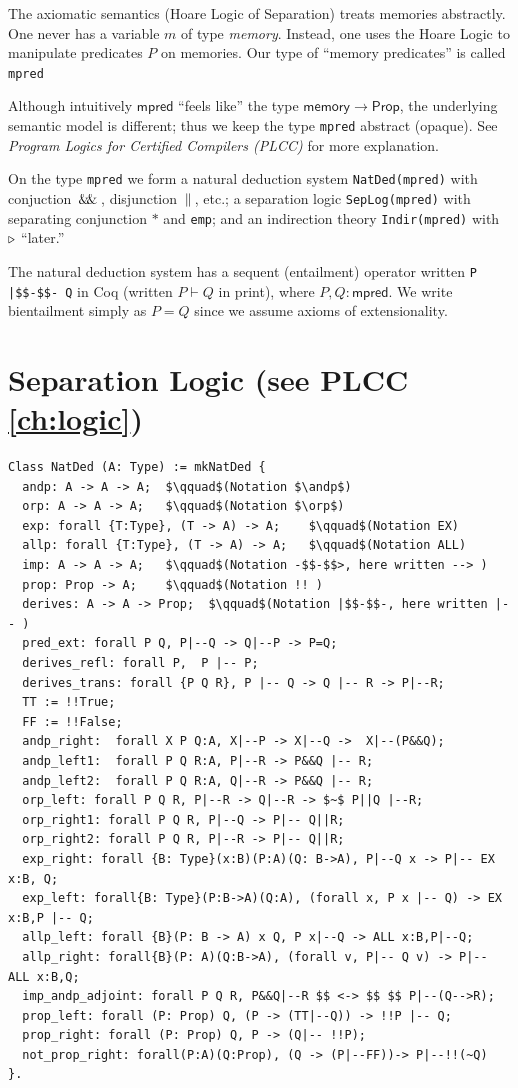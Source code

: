 \documentclass[12pt,fleqn,openany,oneside,showtrims]{memoir}
\newcommand{\ychapter}[2]{\chapter[#1]{#1 \hfill \normalsize #2}}
\begin{document}
The axiomatic semantics (Hoare Logic of Separation) treats
memories abstractly.  One never has a variable $m$ of type
\emph{memory}.  Instead, one uses the Hoare Logic to manipulate
predicates $P$ on memories.  
Our type of ``memory predicates'' is called \lstinline{mpred}

Although intuitively $\mathsf{mpred}$
``feels like'' the type $\mathsf{memory}\rightarrow\mathsf{Prop}$,
the underlying semantic model is different;
thus we keep the type \lstinline{mpred} abstract (opaque).
See \emph{Program Logics for Certified Compilers (PLCC)} 
for more explanation.

On the type \lstinline{mpred}
we form a natural deduction  system 
\lstinline{NatDed(mpred)} with 
conjuction $\,\mathsf{\&\hspace{-.2em}\&}\,$, disjunction $\,\|\,$, etc.;
a separation logic 
\lstinline{SepLog(mpred)} with 
separating conjunction $*$ and \lstinline{emp};
and an indirection theory 
\lstinline{Indir(mpred)} with $\triangleright$ ``later.''

The natural deduction system has a sequent
(entailment) operator written \lstinline{P |$$-$$- Q} in Coq
(written $P\vdash Q$ in print), where $P,Q:\mathsf{mpred}$.  We write
bientailment simply as $P=Q$ since we
assume axioms of extensionality.




\ychapter{Separation Logic}{(see PLCC \autoref{ch:logic})}
\begin{lstlisting}
Class NatDed (A: Type) := mkNatDed {
  andp: A -> A -> A;  $\qquad$(Notation $\andp$)
  orp: A -> A -> A;   $\qquad$(Notation $\orp$)
  exp: forall {T:Type}, (T -> A) -> A;    $\qquad$(Notation EX)
  allp: forall {T:Type}, (T -> A) -> A;   $\qquad$(Notation ALL)
  imp: A -> A -> A;   $\qquad$(Notation -$$-$$>, here written --> )
  prop: Prop -> A;    $\qquad$(Notation !! )
  derives: A -> A -> Prop;  $\qquad$(Notation |$$-$$-, here written |-- )
  pred_ext: forall P Q, P|--Q -> Q|--P -> P=Q;
  derives_refl: forall P,  P |-- P;
  derives_trans: forall {P Q R}, P |-- Q -> Q |-- R -> P|--R;
  TT := !!True;
  FF := !!False;
  andp_right:  forall X P Q:A, X|--P -> X|--Q ->  X|--(P&&Q);
  andp_left1:  forall P Q R:A, P|--R -> P&&Q |-- R;
  andp_left2:  forall P Q R:A, Q|--R -> P&&Q |-- R;
  orp_left: forall P Q R, P|--R -> Q|--R -> $~$ P||Q |--R;
  orp_right1: forall P Q R, P|--Q -> P|-- Q||R;
  orp_right2: forall P Q R, P|--R -> P|-- Q||R;
  exp_right: forall {B: Type}(x:B)(P:A)(Q: B->A), P|--Q x -> P|-- EX x:B, Q;
  exp_left: forall{B: Type}(P:B->A)(Q:A), (forall x, P x |-- Q) -> EX x:B,P |-- Q;
  allp_left: forall {B}(P: B -> A) x Q, P x|--Q -> ALL x:B,P|--Q;
  allp_right: forall{B}(P: A)(Q:B->A), (forall v, P|-- Q v) -> P|-- ALL x:B,Q;
  imp_andp_adjoint: forall P Q R, P&&Q|--R $$ <-> $$ $$ P|--(Q-->R);
  prop_left: forall (P: Prop) Q, (P -> (TT|--Q)) -> !!P |-- Q;
  prop_right: forall (P: Prop) Q, P -> (Q|-- !!P);
  not_prop_right: forall(P:A)(Q:Prop), (Q -> (P|--FF))-> P|--!!(~Q)
}.
\end{lstlisting}
\end{document}
